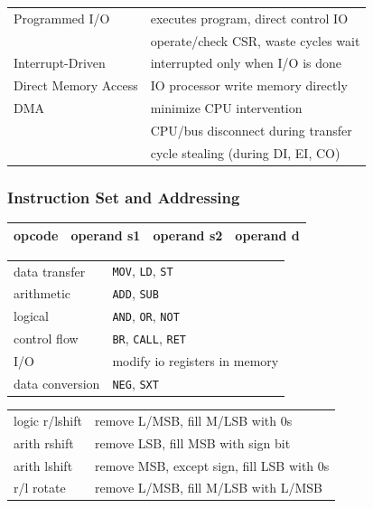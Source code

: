 \documentclass[10pt]{article}
\newcommand{\code}[1]{\texttt{#1}}
\begin{document}
\begin{multicols*}{2}
    \begin{tcolorbox}[title=I/O Techniques]
        \begin{tabular}{ll}
            Programmed I/O       & executes program, direct control IO  \\
            ~                    & operate/check CSR, waste cycles wait \\
            \hline
            Interrupt-Driven     & interrupted only when I/O is done    \\
            \hline
            Direct Memory Access & IO processor write memory directly   \\
            DMA                  & minimize CPU intervention            \\
            ~                    & CPU/bus disconnect during transfer   \\
            ~                    & cycle stealing (during DI, EI, CO)   \\
        \end{tabular}
    \end{tcolorbox}

    \subsubsection*{Instruction Set and Addressing}
    \begin{tcolorbox}[title=Instruction Type/Structure and Shift Operations]
        \begin{tabular}{|c|c|c|c|}
            \hline opcode & operand s1 & operand s2 & operand d \\ \hline
        \end{tabular}
        \begin{tabular}{ll}
            data transfer   & \code{MOV}, \code{LD}, \code{ST}   \\
            arithmetic      & \code{ADD}, \code{SUB}             \\
            logical         & \code{AND}, \code{OR}, \code{NOT}  \\
            control flow    & \code{BR}, \code{CALL}, \code{RET} \\
            I/O             & modify io registers in memory      \\
            data conversion & \code {NEG}, \code{SXT}            \\
        \end{tabular}
        \begin{tabular}{ll}
            \hline
            logic r/lshift & remove L/MSB, fill M/LSB with 0s          \\
            arith rshift   & remove LSB, fill MSB with sign bit        \\
            arith lshift   & remove MSB, except sign, fill LSB with 0s \\
            r/l rotate     & remove L/MSB, fill M/LSB with L/MSB       \\
        \end{tabular}
    \end{tcolorbox}


\end{multicols*}
\end{document}
